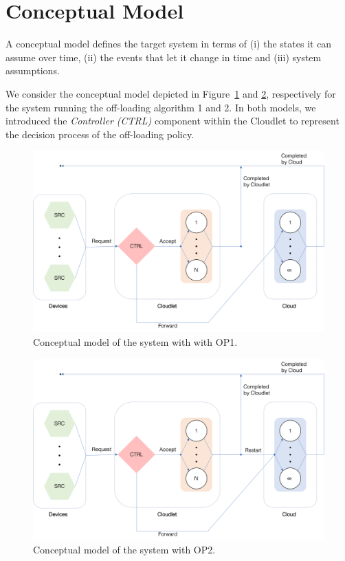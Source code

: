 \section{Conceptual Model}
\label{sec:performance-modeling-conceptual-model}
A conceptual model defines the target system in terms of 
(i) the states it can assume over time, 
(ii) the events that let it change in time and
(iii) system assumptions.

We consider the conceptual model depicted in Figure~\ref{fig:conceptual-model-1} and \ref{fig:conceptual-model-2}, respectively for the system running the off-loading algorithm 1 and 2.
In both models, we introduced the \textit{Controller (CTRL)} component within the Cloudlet to represent the decision process of the off-loading policy.

\begin{figure}
	\includegraphics[width=\columnwidth]{fig/conceptual-model-1}
	\caption{Conceptual model of the system with with OP1.}
	\label{fig:conceptual-model-1}
\end{figure}

\begin{figure}
	\includegraphics[width=\columnwidth]{fig/conceptual-model-2}
	\caption{Conceptual model of the system with OP2.}
	\label{fig:conceptual-model-2}
\end{figure}

